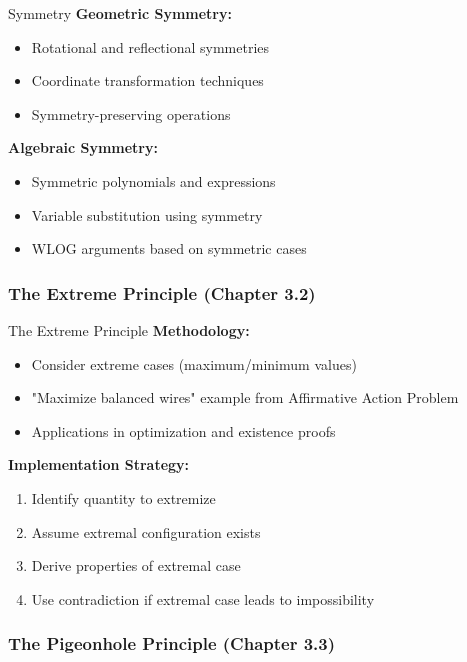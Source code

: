 \documentclass[12pt]{article}
\begin{document}
	\begin{tacticsbox}{Symmetry}
		\textbf{Geometric Symmetry:}
		\begin{itemize}
			\item Rotational and reflectional symmetries
			\item Coordinate transformation techniques
			\item Symmetry-preserving operations
		\end{itemize}
		
		\textbf{Algebraic Symmetry:}
		\begin{itemize}
			\item Symmetric polynomials and expressions
			\item Variable substitution using symmetry
			\item WLOG arguments based on symmetric cases
		\end{itemize}
	\end{tacticsbox}
	
	\subsubsection{The Extreme Principle (Chapter 3.2)}
	
	\begin{tacticsbox}{The Extreme Principle}
		\textbf{Methodology:}
		\begin{itemize}
			\item Consider extreme cases (maximum/minimum values)
			\item "Maximize balanced wires" example from Affirmative Action Problem
			\item Applications in optimization and existence proofs
		\end{itemize}
		
		\textbf{Implementation Strategy:}
		\begin{enumerate}
			\item Identify quantity to extremize
			\item Assume extremal configuration exists
			\item Derive properties of extremal case
			\item Use contradiction if extremal case leads to impossibility
		\end{enumerate}
	\end{tacticsbox}
	
	\subsubsection{The Pigeonhole Principle (Chapter 3.3)}
	
\end{document}
